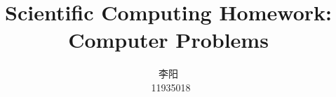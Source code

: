 \documentclass[10pt,a4paper]{article}
\title{Scientific Computing Homework: Computer Problems}
\author{\begin{CJK*}{UTF8}{gkai}
    李阳
    \end{CJK*}\, 11935018}
\begin{document}
\maketitle

\renewcommand\theenumi{\roman{enumi}}
\renewcommand\labelenumi{(\theenumi)}



\clearpage



\clearpage



\clearpage



\clearpage



\clearpage


\end{document}
